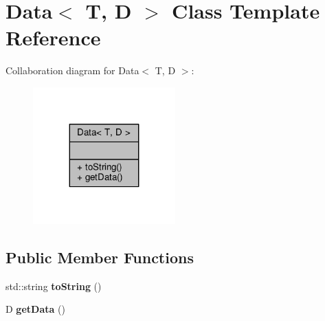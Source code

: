 \hypertarget{class_data}{}\section{Data$<$ T, D $>$ Class Template Reference}
\label{class_data}


Collaboration diagram for Data$<$ T, D $>$\+:
\nopagebreak
\begin{figure}[H]
\begin{center}
\leavevmode
\includegraphics[width=155pt]{class_data__coll__graph}
\end{center}
\end{figure}
\subsection*{Public Member Functions}
\begin{DoxyCompactItemize}
\item 
std\+::string {\bfseries to\+String} ()\hypertarget{class_data_a8f7071b4c9d15f57af376b981a6e3c12}{}\label{class_data_a8f7071b4c9d15f57af376b981a6e3c12}

\item 
D {\bfseries get\+Data} ()\hypertarget{class_data_a8998e5093d23c19b585ad829e65e3b8b}{}\label{class_data_a8998e5093d23c19b585ad829e65e3b8b}

\end{DoxyCompactItemize}
